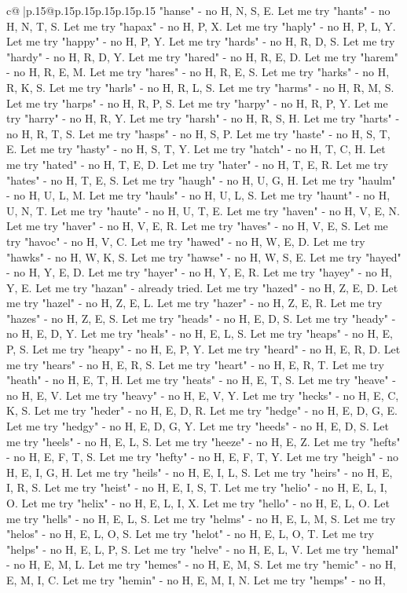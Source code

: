 \documentclass{article}
\begin{document}
{\begin{supertabular}{c@{$\;$}|p{.15\linewidth}@{}p{.15\linewidth}p{.15\linewidth}p{.15\linewidth}p{.15\linewidth}p{.15\linewidth}}
{{{"hanse" {-} no H, N, S, E. Let me try "hants" {-} no H, N, T, S. Let me try "hapax" {-} no H, P, X. Let me try "haply" {-} no H, P, L, Y. Let me try "happy" {-} no H, P, Y. Let me try "hards" {-} no H, R, D, S. Let me try "hardy" {-} no H, R, D, Y. Let me try "hared" {-} no H, R, E, D. Let me try "harem" {-} no H, R, E, M. Let me try "hares" {-} no H, R, E, S. Let me try "harks" {-} no H, R, K, S. Let me try "harls" {-} no H, R, L, S. Let me try "harms" {-} no H, R, M, S. Let me try "harps" {-} no H, R, P, S. Let me try "harpy" {-} no H, R, P, Y. Let me try "harry" {-} no H, R, Y. Let me try "harsh" {-} no H, R, S, H. Let me try "harts" {-} no H, R, T, S. Let me try "hasps" {-} no H, S, P. Let me try "haste" {-} no H, S, T, E. Let me try "hasty" {-} no H, S, T, Y. Let me try "hatch" {-} no H, T, C, H. Let me try "hated" {-} no H, T, E, D. Let me try "hater" {-} no H, T, E, R. Let me try "hates" {-} no H, T, E, S. Let me try "haugh" {-} no H, U, G, H. Let me try "haulm" {-} no H, U, L, M. Let me try "hauls" {-} no H, U, L, S. Let me try "haunt" {-} no H, U, N, T. Let me try "haute" {-} no H, U, T, E. Let me try "haven" {-} no H, V, E, N. Let me try "haver" {-} no H, V, E, R. Let me try "haves" {-} no H, V, E, S. Let me try "havoc" {-} no H, V, C. Let me try "hawed" {-} no H, W, E, D. Let me try "hawks" {-} no H, W, K, S. Let me try "hawse" {-} no H, W, S, E. Let me try "hayed" {-} no H, Y, E, D. Let me try "hayer" {-} no H, Y, E, R. Let me try "hayey" {-} no H, Y, E. Let me try "hazan" {-} already tried. Let me try "hazed" {-} no H, Z, E, D. Let me try "hazel" {-} no H, Z, E, L. Let me try "hazer" {-} no H, Z, E, R. Let me try "hazes" {-} no H, Z, E, S. Let me try "heads" {-} no H, E, D, S. Let me try "heady" {-} no H, E, D, Y. Let me try "heals" {-} no H, E, L, S. Let me try "heaps" {-} no H, E, P, S. Let me try "heapy" {-} no H, E, P, Y. Let me try "heard" {-} no H, E, R, D. Let me try "hears" {-} no H, E, R, S. Let me try "heart" {-} no H, E, R, T. Let me try "heath" {-} no H, E, T, H. Let me try "heats" {-} no H, E, T, S. Let me try "heave" {-} no H, E, V. Let me try "heavy" {-} no H, E, V, Y. Let me try "hecks" {-} no H, E, C, K, S. Let me try "heder" {-} no H, E, D, R. Let me try "hedge" {-} no H, E, D, G, E. Let me try "hedgy" {-} no H, E, D, G, Y. Let me try "heeds" {-} no H, E, D, S. Let me try "heels" {-} no H, E, L, S. Let me try "heeze" {-} no H, E, Z. Let me try "hefts" {-} no H, E, F, T, S. Let me try "hefty" {-} no H, E, F, T, Y. Let me try "heigh" {-} no H, E, I, G, H. Let me try "heils" {-} no H, E, I, L, S. Let me try "heirs" {-} no H, E, I, R, S. Let me try "heist" {-} no H, E, I, S, T. Let me try "helio" {-} no H, E, L, I, O. Let me try "helix" {-} no H, E, L, I, X. Let me try "hello" {-} no H, E, L, O. Let me try "hells" {-} no H, E, L, S. Let me try "helms" {-} no H, E, L, M, S. Let me try "helos" {-} no H, E, L, O, S. Let me try "helot" {-} no H, E, L, O, T. Let me try "helps" {-} no H, E, L, P, S. Let me try "helve" {-} no H, E, L, V. Let me try "hemal" {-} no H, E, M, L. Let me try "hemes" {-} no H, E, M, S. Let me try "hemic" {-} no H, E, M, I, C. Let me try "hemin" {-} no H, E, M, I, N. Let me try "hemps" {-} no H, }}}
\end{supertabular}}
\end{document}
